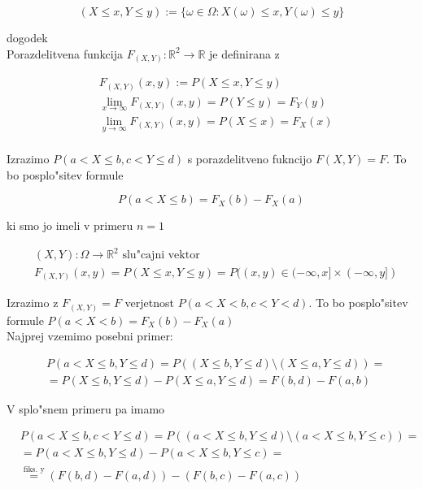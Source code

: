 \documentclass[a4paper,12pt]{article}
\theoremstyle{definition}
\theoremstyle{remark}
\newcommand{\R}{\mathbb{R}}
\begin{document}
\begin{equation*}
    (X \leq x, Y \leq y) := \{\omega \in \Omega: X(\omega) \leq x, Y(\omega) \leq y\}
\end{equation*}

dogodek \\
Porazdelitvena funkcija $F_{(X,Y)}: \R^2 \to \R$ je definirana z

\begin{align*}
    &F_{(X,Y)}(x,y) := P(X \leq x, Y \leq y) \\
    &\lim_{x \to \infty} F_{(X,Y)}(x,y) = P(Y \leq y) = F_Y(y) \\
    &\lim_{y \to \infty} F_{(X,Y)}(x,y) = P(X \leq x) = F_X(x) \\
\end{align*}

Izrazimo $P(a < X \leq b, c < Y \leq d)$ s porazdelitveno fukncijo $F(X,Y) = F$. To bo posplo"sitev formule

\begin{equation*}
    P(a < X \leq b) = F_X(b) - F_X(a)
\end{equation*}

ki smo jo imeli v primeru $n=1$




\begin{align*}
    &(X,Y): \Omega \to \R^2 \text{ slu"cajni vektor} \\
    &F_{(X,Y)}(x,y) = P(X \leq x, Y \leq y) = P((x,y) \in (-\infty, x] \times (-\infty, y])
\end{align*}

Izrazimo z $F_{(X,Y)} = F$ verjetnost $P(a < X < b, c < Y < d)$. To bo posplo"sitev formule
$P(a < X < b) = F_X(b) - F_X(a)$ \\
Najprej vzemimo posebni primer:

\begin{align*}
    &P(a < X \leq b, Y \leq d) = P((X \leq b, Y \leq d) \text{\textbackslash} (X \leq a, Y \leq d)) = \\
    &=P (X \leq b, Y \leq d) - P(X \leq a, Y \leq d) = F(b,d) - F(a,b)
\end{align*}

V splo"snem primeru pa imamo

\begin{align*}
    &P(a < X \leq b, c < Y \leq d) = P((a < X \leq b, Y \leq d) \text{\textbackslash}
        (a < X \leq b, Y \leq c)) = \\
    &= P(a < X \leq b, Y \leq d) - P(a < X \leq b, Y \leq c) = \\
    &\stackrel{\text{fiks. y}}{=} (F(b,d) - F(a,d)) - (F(b,c) - F(a,c))
\end{align*}
\end{document}
